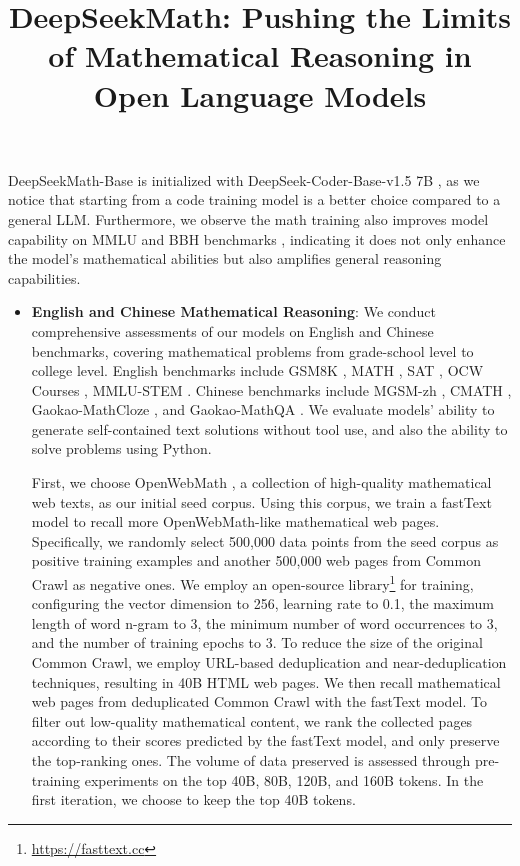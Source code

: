 \title{DeepSeekMath: Pushing the Limits of Mathematical Reasoning in Open Language Models}
DeepSeekMath-Base is initialized with DeepSeek-Coder-Base-v1.5 7B \citep{deepseek-coder}, as we notice that starting from a code training model is a better choice compared to a general LLM. Furthermore, we observe the math training also improves model capability on MMLU \citep{mmlu} and BBH benchmarks \citep{bbh}, indicating it does not only enhance the model's mathematical abilities but also amplifies general reasoning capabilities.

\begin{itemize}[topsep=0pt]
    \item \textbf{English and Chinese Mathematical Reasoning}: We conduct comprehensive assessments of our models on English and Chinese benchmarks, covering mathematical problems from grade-school level to college level. English benchmarks include GSM8K \citep{gsm8k}, MATH \citep{MATH}, SAT \citep{llemma}, OCW Courses \citep{minerva}, MMLU-STEM \citep{mmlu}. Chinese benchmarks include MGSM-zh \citep{mgsm}, CMATH \citep{wei2023cmath}, Gaokao-MathCloze \citep{agieval}, and Gaokao-MathQA \citep{agieval}. We evaluate models' ability to generate self-contained text solutions without tool use, and also the ability to solve problems using Python.

First, we choose OpenWebMath \citep{openwebmath}, a collection of high-quality mathematical web texts, as our initial seed corpus. Using this corpus, we train a fastText model \citep{joulin2016fasttext} to recall more OpenWebMath-like mathematical web pages. Specifically, we randomly select 500,000 data points from the seed corpus as positive training examples and another 500,000 web pages from Common Crawl as negative ones. We employ an open-source library\footnote{\url{https://fasttext.cc}} for training, configuring the vector dimension to 256, learning rate to 0.1, the maximum length of word n-gram to 3, the minimum number of word occurrences to 3, and the number of training epochs to 3. To reduce the size of the original Common Crawl, we employ URL-based deduplication and near-deduplication techniques, resulting in 40B HTML web pages. We then recall mathematical web pages from deduplicated Common Crawl with the fastText model. To filter out low-quality mathematical content, we rank the collected pages according to their scores predicted by the fastText model, and only preserve the top-ranking ones. The volume of data preserved is assessed through pre-training experiments on the top 40B, 80B, 120B, and 160B tokens. In the first iteration, we choose to keep the top 40B tokens.


\end{itemize}
